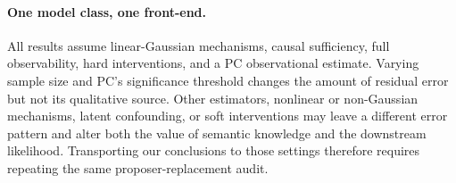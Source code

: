 \documentclass{article}
\begin{document}
\paragraph{One model class, one front-end.}
All results assume linear-Gaussian mechanisms, causal sufficiency, full observability, hard
interventions, and a PC observational estimate. Varying sample size and PC's significance threshold
changes the amount of residual error but not its qualitative source. Other estimators, nonlinear or
non-Gaussian mechanisms, latent confounding, or soft interventions may leave a different error
pattern and alter both the value of semantic knowledge and the downstream likelihood. Transporting
our conclusions to those settings therefore requires repeating the same proposer-replacement audit.
\end{document}
